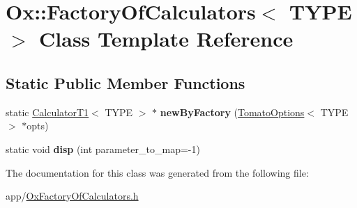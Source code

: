 \hypertarget{class_ox_1_1_factory_of_calculators}{\section{Ox\-:\-:Factory\-Of\-Calculators$<$ T\-Y\-P\-E $>$ Class Template Reference}
\label{class_ox_1_1_factory_of_calculators}
}
\subsection*{Static Public Member Functions}
\begin{DoxyCompactItemize}
\item 
\hypertarget{class_ox_1_1_factory_of_calculators_a898d51ba166e4afaaa730d18e685e93b}{static \hyperlink{class_ox_1_1_calculator_t1}{Calculator\-T1}$<$ T\-Y\-P\-E $>$ $\ast$ {\bfseries new\-By\-Factory} (\hyperlink{struct_ox_1_1_tomato_options}{Tomato\-Options}$<$ T\-Y\-P\-E $>$ $\ast$opts)}\label{class_ox_1_1_factory_of_calculators_a898d51ba166e4afaaa730d18e685e93b}

\item 
\hypertarget{class_ox_1_1_factory_of_calculators_a25117329e54b745cf545a4fb5541fed0}{static void {\bfseries disp} (int parameter\-\_\-to\-\_\-map=-\/1)}\label{class_ox_1_1_factory_of_calculators_a25117329e54b745cf545a4fb5541fed0}

\end{DoxyCompactItemize}


The documentation for this class was generated from the following file\-:\begin{DoxyCompactItemize}
\item 
app/\hyperlink{_ox_factory_of_calculators_8h}{Ox\-Factory\-Of\-Calculators.\-h}\end{DoxyCompactItemize}
